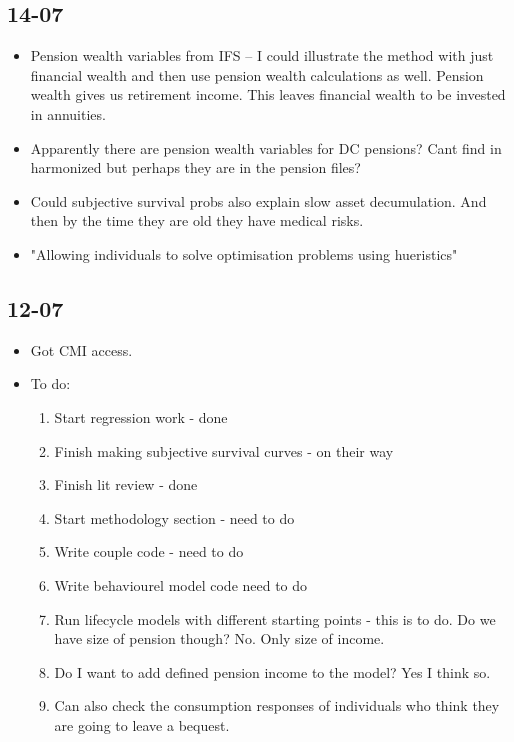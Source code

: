 \documentclass[12pt]{article}
\begin{document}
\subsection{\textbf{14-07}}
\begin{itemize}
  \item Pension wealth variables from IFS -- I could illustrate
        the method with just financial wealth and then use pension wealth calculations
        as well. Pension wealth gives us retirement income. This leaves financial wealth to be
        invested in annuities.

  \item Apparently there are pension wealth variables for DC pensions?
        Cant find in harmonized but perhaps they are in the pension files?

  \item Could subjective survival probs also explain slow asset decumulation. And then by the time they are old
        they have medical risks.

  \item "Allowing individuals to solve optimisation problems using hueristics"
\end{itemize}

\subsection{\textbf{12-07}}
\begin{itemize}

  \item Got CMI access.

  \item To do: \begin{enumerate}
          \item Start regression work - done
          \item Finish making subjective survival curves - on their way
          \item Finish lit review - done
          \item Start methodology section - need to do
          \item Write couple code - need to do
          \item Write behaviourel model code need to do
          \item Run lifecycle models with different starting points - this is to do.
                Do we have size of pension though? No. Only size of income.

          \item Do I want to add defined pension income to the model? Yes I think so.
          \item Can also check the consumption responses of individuals who think they are going to leave a bequest.
        \end{enumerate}
\end{itemize}
\end{document}

